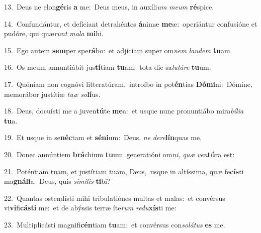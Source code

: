 {\numbfont\textcolor{\numbcolor}{13.}}~Deus ne elon\-\textbf{gé}\-ris \textbf{a} me:~\star Deus meus, in auxíli\textit{um} \textit{me}\-\textit{um} \textbf{ré}\-spice.\par
{\numbfont\textcolor{\numbcolor}{14.}}~Confundántur, et defíciant detrahéntes \textbf{á}\-nimæ \textbf{me}\-æ:~\star operiántur confusióne et pudóre, qui quæ\textit{runt} \textit{ma}\-\textit{la} \textbf{mi}\-hi.\par
{\numbfont\textcolor{\numbcolor}{15.}}~Ego autem \textbf{sem}\-per spe\-\textbf{rá}\-bo:~\star et adjíciam super om\textit{nem} \textit{lau}\-\textit{dem} \textbf{tu}\-am.\par
{\numbfont\textcolor{\numbcolor}{16.}}~Os meum annuntiábit jus\-\textbf{tí}\-tiam \textbf{tu}\-am:~\star tota die sa\-\textit{lu}\-\textit{tá}\textit{re} \textbf{tu}\-um.\par
{\numbfont\textcolor{\numbcolor}{17.}}~Quóniam non cognóvi litteratúram,~\dagger introíbo in pot\-\textbf{én}\-tias \textbf{Dó}\-\textbf{mi}ni:~\star Dómine, memorábor justítiæ \textit{tu}\-\textit{æ} \textit{so}\-\textbf{lí}us.\par
{\numbfont\textcolor{\numbcolor}{18.}}~Deus, docuísti me a juven\-\textbf{tú}\-te \textbf{me}\-a:~\star et usque nunc pronuntiábo mira\-\textit{bí}\-\textit{li}\textit{a} \textbf{tu}\-a.\par
{\numbfont\textcolor{\numbcolor}{19.}}~Et usque in se\-\textbf{néc}\-tam et \textbf{sé}\-\textbf{ni}um:~\star Deus, \textit{ne} \textit{de}\-\textit{re}\textbf{lín}quas me,\par
{\numbfont\textcolor{\numbcolor}{20.}}~Donec annúntiem \textbf{brá}\-chium \textbf{tu}\-um~\star generatióni om\-\textit{ni}\-, \textit{quæ} \textit{ven}\-\textbf{tú}ra est:\par
{\numbfont\textcolor{\numbcolor}{21.}}~Poténtiam tuam, et justítiam tuam, Deus,~\dagger usque in altíssima, quæ fe\-\textbf{cís}\-ti ma\-\textbf{gná}\-\textbf{li}a:~\star Deus, quis \textit{sí}\-\textit{mi}\textit{lis} \textbf{ti}\-bi?\par
{\numbfont\textcolor{\numbcolor}{22.}}~Quantas ostendísti mihi tribulatiónes multas et malas:~\dagger et convérsus vi\-\textbf{vi}\-fi\-\textbf{cás}\-\textbf{ti} me:~\star et de abýssis terræ íte\textit{rum} \textit{re}\-\textit{du}\textbf{xís}ti me:\par
{\numbfont\textcolor{\numbcolor}{23.}}~Multiplicásti magnifi\-\textbf{cén}\-tiam \textbf{tu}\-am:~\star et convérsus con\-\textit{so}\-\textit{lá}\textit{tus} \textbf{es} me.\par
